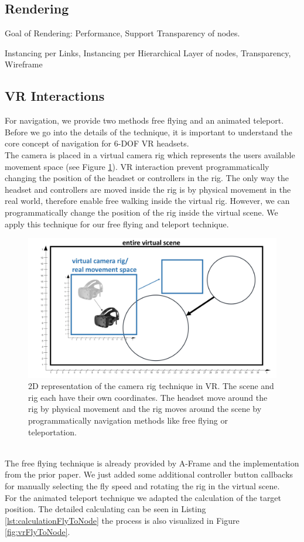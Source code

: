 \subsection{Rendering}
\label{sec:rendering}
Goal of Rendering: 
Performance, Support Transparency of nodes. 

Instancing per Links, 
Instancing per Hierarchical Layer of nodes, 
Transparency,
Wireframe

\subsection{VR Interactions}
\label{sec:vrInteractions}

For navigation, we provide two methods free flying and an animated teleport.
Before we go into the details of the technique, it is important to understand the core concept of navigation for 6-DOF VR headsets.\\
The camera is placed in a virtual camera rig which represents the users available movement space (see Figure \ref{fig:vrCameraRig}). 
VR interaction prevent programmatically changing the position of the headset or controllers in the rig. 
The only way the headset and controllers are moved inside the rig is by physical movement in the real world, therefore enable free walking inside the virtual rig.
However, we can programmatically change the position of the rig inside the virtual scene. 
We apply this technique for our free flying and teleport technique.
\begin{figure}[h]
    \centering
    \includegraphics[width=1\textwidth]{graphics/vrCameraRig.jpg}
    \caption{2D representation of the camera rig technique in VR. The scene and rig each have their own coordinates. The headset move around the rig by physical movement and the rig moves around the scene by programmatically navigation methods like free flying or teleportation.} 
    \label{fig:vrCameraRig} 
\end{figure}
\\
The free flying technique is already provided by A-Frame and the implementation from the prior paper.
We just added some additional controller button callbacks for manually selecting the fly speed and rotating the rig in the virtual scene.\\
For the animated teleport technique we adapted the calculation of the target position. The detailed calculating can be seen in Listing \ref{lst:calculationFlyToNode} the process is also visualized in Figure \ref{fig:vrFlyToNode}.

